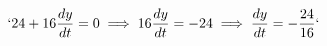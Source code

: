 \documentclass[preview]{standalone}
\begin{document}
\begin{align*}
`24 + 16\frac{dy}{dt} = 0 \implies 16\frac{dy}{dt} = -24 \implies \frac{dy}{dt} = -\frac{24}{16}`
\end{align*}
\end{document}
